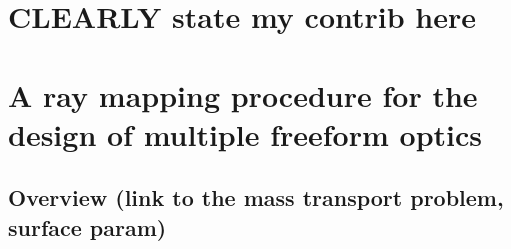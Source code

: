 \chapter{CLEARLY state my contrib here}

\chapter{A ray mapping procedure for the design of multiple freeform optics}
\label{ch:core}

\section{Overview (link to the mass transport problem, surface param)}






